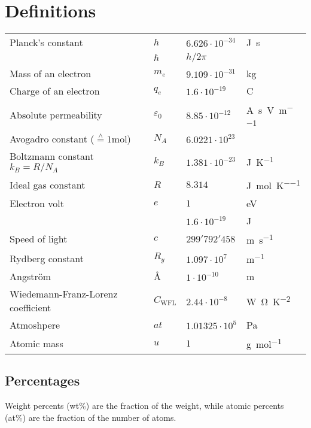 \section{Definitions}

\begin{table*}[ht]
    \begin{tabularx}{\linewidth}{Xlll}
        \toprule
    	Planck's constant & $h$ & $6.626 \cdot 10^{-34}$ & \si{\J\second} \\
    		& $\hbar$ & $h / 2\pi$ & \\
    	Mass of an electron & $m_e$ &  $9.109 \cdot 10^{-31}$ & \si{\kilogram} \\
    	Charge of an electron & $q_e$ & $1.6 \cdot 10^{-19}$ & \si{\coulomb} \\
    	Absolute permeability & $\varepsilon_0$ & $8.85 \cdot 10^{-12}$ & \si{\ampere\second\per\volt\per\meter} \\
    	Avogadro constant  ($\stackrel{\wedge}{=}1$\si{\mol})& $N_A$ & $6.0221 \cdot 10^{23}$ & \\
    	Boltzmann constant $k_B = R / N_A$& $k_B$ & $1.381 \cdot10^{-23}$ & \si{\J\per\K} \\
    	Ideal gas constant & $R$ & $8.314$ & \si{\J\per\mol\per\K} \\
    	Electron volt & $e$ & $1$ & \si{\eV} \\
    		& & $1.6 \cdot 10^{-19}$ & \si{\J} \\ 
    	Speed of light & $c$ & $299'792'458$ & \si{\meter\per\second} \\
    	Rydberg constant & $R_y$ & $1.097 \cdot 10^{7}$ & \si{\meter\tothe{-1}} \\
    	Angström & \AA & $1 \cdot 10^{-10}$ & \si{\meter} \\
    	Wiedemann-Franz-Lorenz coefficient & $C_{\mathrm{WFL}}$ & $2.44 \cdot 10^{-8}$ & \si{\watt\ohm\per\square\kelvin} \\
    	Atmoshpere & $at$ & $1.01325 \cdot 10^5$ & \si{\pascal} \\
    	Atomic mass & $u$ & $1$ & \si{\g\per\mol}\\
    	\bottomrule
    \end{tabularx}
\end{table*}

\subsection{Percentages}
Weight percents (wt\%) are the fraction of the weight, while atomic percents (at\%) are the fraction of the number of atoms.